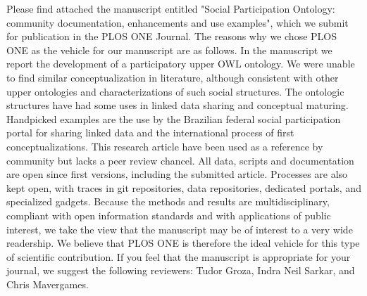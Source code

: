 \documentclass[10pt,stdletter,dateno,sigleft]{newlfm} %
\begin{document}
\begin{newlfm}


	Please find attached the manuscript entitled "Social Participation Ontology: community documentation, enhancements and use examples", which we submit for publication in the PLOS ONE Journal. The reasons why we chose PLOS ONE as the vehicle for our manuscript are as follows.
	In the manuscript we report the development of a participatory upper OWL ontology.
	We were unable to find similar conceptualization in literature, although consistent with other upper ontologies and characterizations of such social structures.
	The ontologic structures have had some uses in linked data sharing and conceptual maturing.
	Handpicked examples are the use by the Brazilian federal social participation portal for sharing linked data
	and the international process of first conceptualizations.
	This research article have been used as a reference by community but lacks a peer review chancel.
	All data, scripts and documentation are open since first versions, including the submitted article.
	Processes are also kept open, with traces in git repositories, data repositories,
	dedicated portals, and specialized gadgets.
	Because the methods and results are multidisciplinary, compliant with open information standards and with applications of public interest,
	we take the view that the manuscript may be of interest to a very wide readership.
	 We believe that PLOS ONE is therefore the ideal vehicle for this type of scientific contribution.
	 If
	 you feel that the manuscript is appropriate for your journal, we suggest the following reviewers: 
	 Tudor Groza,
	 Indra Neil Sarkar,                                                        and 
	 Chris Mavergames.

%
%





\end{newlfm}
\end{document}
